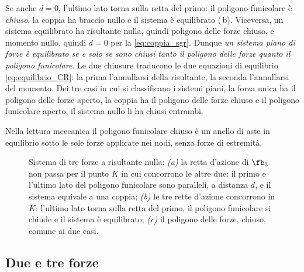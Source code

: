 Se anche $d = 0$, l'ultimo lato torna sulla retta del primo: il poligono funicolare è
\emph{chiuso}, la coppia ha braccio nullo e il sistema è equilibrato
(\,b). Viceversa, un sistema equilibrato ha risultante nulla, quindi
poligono delle forze chiuso, e momento nullo, quindi $d = 0$ per la \eqref{eq:coppia_sgr}.
Dunque \emph{un sistema piano di forze è equilibrato se e solo se sono chiusi tanto il poligono
delle forze quanto il poligono funicolare}. Le due chiusure traducono le due equazioni di
equilibrio \eqref{eq:equilibrio_CR}: la prima l'annullarsi della risultante, la seconda
l'annullarsi del momento. Dei tre casi in cui si classificano i sistemi piani, la forza unica ha
il poligono delle forze aperto, la coppia ha il poligono delle forze chiuso e il poligono
funicolare aperto, il sistema nullo li ha chiusi entrambi.

Nella lettura meccanica il poligono funicolare chiuso è un anello di aste in equilibrio sotto le
sole forze applicate nei nodi, senza forze di estremità.

\begin{figure}[htbp]
	\centering
	\caption{Sistema di tre forze a risultante nulla: \emph{(a)} la retta d'azione di $\fb_3$ non
		passa per il punto $K$ in cui concorrono le altre due: il primo e l'ultimo lato del poligono
		funicolare sono paralleli, a distanza $d$, e il sistema equivale a una coppia; \emph{(b)} le tre
		rette d'azione concorrono in $K$: l'ultimo lato torna sulla retta del primo, il poligono
		funicolare si chiude e il sistema è equilibrato; \emph{(c)} il poligono delle forze, chiuso,
		comune ai due casi.}
	\label{fig:equilibrio_sgr}
\end{figure}

\subsection{Due e tre forze}
\label{sec:tre_forze_sgr}

